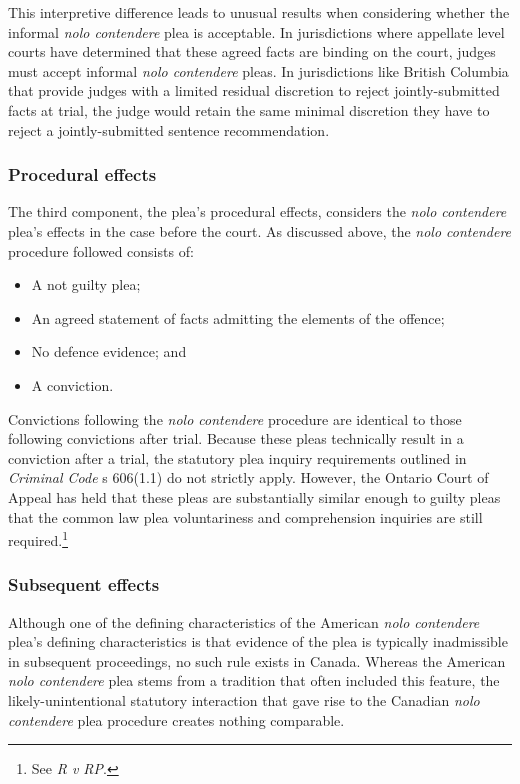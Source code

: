 This interpretive difference leads to unusual results when considering whether the informal \textit{nolo contendere} plea is acceptable. In jurisdictions where appellate level courts have determined that these agreed facts are binding on the court, judges must accept informal \textit{nolo contendere} pleas. In jurisdictions like British Columbia that provide judges with a limited residual discretion to reject jointly-submitted facts at trial, the judge would retain the same minimal discretion they have to reject a jointly-submitted sentence recommendation.

\subsubsection{Procedural effects}

The third component, the plea's procedural effects, considers the \textit{nolo contendere} plea's effects in the case before the court. As discussed above, the \textit{nolo contendere} procedure followed consists of:

\begin{itemize}
    \item A not guilty plea;
    \item An agreed statement of facts admitting the elements of the offence;
    \item No defence evidence; and
    \item A conviction.
\end{itemize}

Convictions following the \textit{nolo contendere} procedure are identical to those following convictions after trial. Because these pleas technically result in a conviction after a trial, the statutory plea inquiry requirements outlined in \textit{Criminal Code} s 606(1.1) do not strictly apply. However, the Ontario Court of Appeal has held that these pleas are substantially similar enough to guilty pleas that the common law plea voluntariness and comprehension inquiries are still required.\footnote{See \textit{R v RP}.}

\subsubsection{Subsequent effects}

Although one of the defining characteristics of the American \textit{nolo contendere} plea's defining characteristics is that evidence of the plea is typically inadmissible in subsequent proceedings, no such rule exists in Canada. Whereas the American \textit{nolo contendere} plea stems from a tradition that often included this feature, the likely-unintentional statutory interaction that gave rise to the Canadian \textit{nolo contendere} plea procedure creates nothing comparable. 

